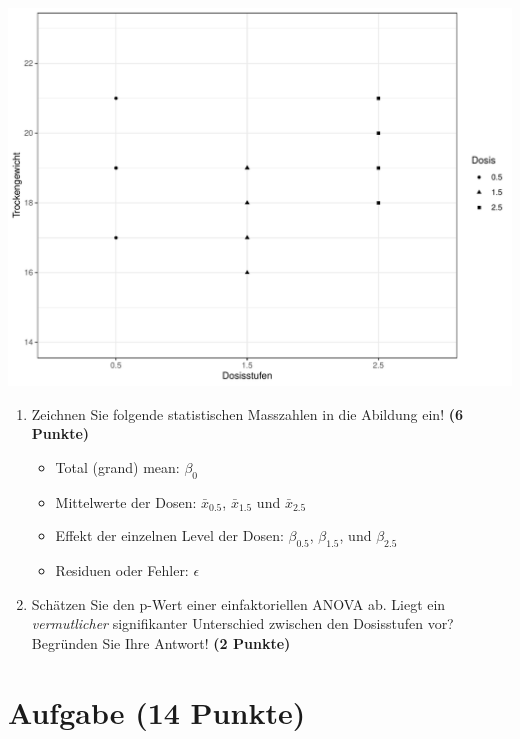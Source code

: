 \documentclass[a4paper, 10pt]{scrartcl}\usepackage[]{graphicx}\usepackage[]{xcolor}
\makeatletter
\def\maxwidth{ %
  \ifdim\Gin@nat@width>\linewidth
    \linewidth
  \else
    \Gin@nat@width
  \fi
}
\newenvironment{knitrout}{}{} %
\makeatother
\begin{document}
\begin{knitrout}
\color{fgcolor}

{\centering \includegraphics[width=\maxwidth]{img/anova-01-a-1} 

}


\end{knitrout}

\begin{enumerate}
\item Zeichnen Sie folgende statistischen Masszahlen in die Abildung ein! \textbf{(6 Punkte)}
  \begin{itemize}
  \item Total (grand) mean: $\beta_0$
  \item Mittelwerte der Dosen: $\bar{x}_{0.5}$, $\bar{x}_{1.5}$ und $\bar{x}_{2.5}$
  \item Effekt der einzelnen Level der Dosen: $\beta_{0.5}$, $\beta_{1.5}$,
    und $\beta_{2.5}$
  \item Residuen oder Fehler: $\epsilon$
  \end{itemize}
\item Sch{\"a}tzen Sie den p-Wert einer einfaktoriellen ANOVA ab. Liegt ein
  \textit{vermutlicher} signifikanter Unterschied zwischen den Dosisstufen
  vor? Begr{\"u}nden Sie Ihre Antwort! \textbf{(2 Punkte)}
\end{enumerate}
 
\clearpage

\section{Aufgabe \hfill (14 Punkte)}
\end{document}
